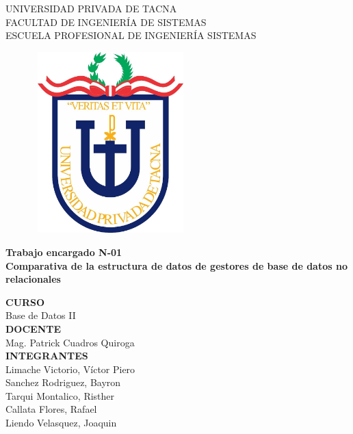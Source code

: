 \documentclass[12pt,a4paper,oneside]{book}
\begin{document}
	
	\thispagestyle{empty} 
	
	\begin{center} 
		\LARGE{UNIVERSIDAD PRIVADA DE TACNA} \\[0.5cm] 
		\Large{FACULTAD DE INGENIER\'IA DE SISTEMAS}\\[0.5cm] 
		\large{ ESCUELA PROFESIONAL DE INGENIER\'IA SISTEMAS} 
	\end{center}
	
	\begin{figure}[htb]
		\centering \includegraphics[width=6cm, height=7cm]{img/uptlogo.jpg}
	\end{figure}
	
	\begin{center} 
		\LARGE{\bf Trabajo encargado N-01 }\\
		\LARGE{\bf Comparativa de la estructura de datos de gestores de base de datos no relacionales }\\ \vspace{.25cm}
		
	\end{center}
	
	\begin{center} 
		
		\textbf {CURSO}\\ 
		\large Base de Datos II \\
		
		\textbf {DOCENTE}\\
		\large Mag. Patrick Cuadros Quiroga\\
		
		\textbf {INTEGRANTES}\\
		\large Limache Victorio, V\'ictor Piero  \\
		\large Sanchez Rodriguez, Bayron  \\
		\large Tarqui Montalico, Risther  \\
		\large Callata Flores, Rafael \\
		\large Liendo Velasquez, Joaquin \\
		
	\end{center}
	
\end{document}
